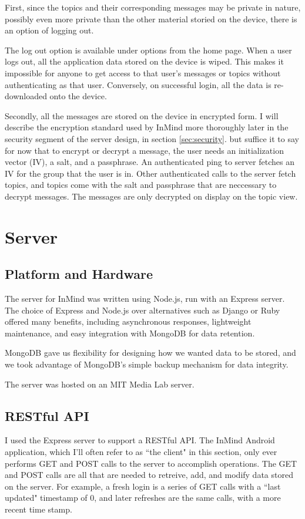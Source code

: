       First, since the topics and their corresponding messages may be private in nature,
      possibly even more private than the other material storied on the device,
      there is an option of logging out.

      The log out option is available under options from the home page.
      When a user logs out, all the application data stored on the device is wiped.
      This makes it impossible for anyone to get access to that user's
      messages or topics without authenticating as that user.
      Conversely, on successful login, all the data is re-downloaded onto the device.

      Secondly, all the messages are stored on the device in encrypted form.
      I will describe the encryption standard used by InMind more thoroughly
      later in the security segment of the server design, in section \ref{sec:security}.
      but suffice it to say for now that to encrypt or decrypt a message, 
      the user needs an initialization vector (IV),
      a salt, and a passphrase.
      An authenticated ping to server fetches an IV for the group that the user is in.
      Other authenticated calls to the server fetch topics,
      and topics come with the salt and passphrase that are neccessary to decrypt messages.
      The messages are only decrypted on display on the topic view.

  \section{Server}
    \subsection{Platform and Hardware}
      The server for InMind was written using Node.js, run with an Express server.
      The choice of Express and Node.js over alternatives such as Django or Ruby
      offered many benefits, including asynchronous responses,
      lightweight maintenance, and easy integration with MongoDB for data retention.

      MongoDB gave us flexibility for designing how we wanted data to be stored,
      and we took advantage of MongoDB's simple backup mechanism for data integrity.

      The server was hosted on an MIT Media Lab server.

    \subsection{RESTful API}
      I used the Express server to support a RESTful API.
      The InMind Android application,
      which I'll often refer to as ``the client" in this section,
      only ever performs GET and POST calls to the server to accomplish operations.
      The GET and POST calls are all that are needed to
      retreive, add, and modify data stored on the server.
      For example, a fresh login is a series of GET calls with a ``last updated" timestamp
      of 0, and later refreshes are the same calls, with a more recent time stamp.

